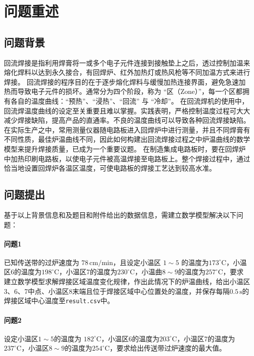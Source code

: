 \documentclass[../main.tex]{subfiles}
\begin{document}
\section{问题重述}
\subsection{问题背景}
回流焊接是指利用焊膏将一或多个电子元件连接到接触垫上之后，透过控制加温来熔化焊料以达到永久接合，有回焊炉、红外加热灯或热风枪等不同加温方式来进行焊接。
回流焊接的程序目的在于逐步熔化焊料与缓慢加热连接界面，避免急速加热而导致电子元件的损坏。通常分为四个阶段，称为 “区（Zone）”，每一个区都拥有各自的温度曲线：“预热”、“浸热”、“回流” 与 “冷却”。
在回流焊机的使用中，回流焊温度曲线的设定至关重要且难以掌握。实践表明，严格控制温度过程可大大减少焊接缺陷，提高产品的直通率。不良的温度曲线可以导致各种回流焊接缺陷。在实际生产之中，常用测量仪器随电路板进入回焊炉中进行测量，并且不同焊膏有不同性质，最佳炉温曲线不同，因此如何构建出回流焊接过程之中炉温曲线的数学模型来提升焊接质量，已成为一个重要议题。
在制造集成电路板时，要在回焊炉中加热印刷电路板，以使电子元件被高温焊接至电路板上。整个焊接过程中，通过恰当地设置回焊炉各温区温度，可使电路板的焊接工艺达到较高水准。

\subsection{问题提出} %
基于以上背景信息和及题目和附件给出的数据信息，需建立数学模型解决以下问题：

\paragraph{问题1}
已知传送带的过炉速度为 \(78\,\mathrm{cm}/\mathrm{min}\)，且设定小温区 \(1{\sim}5\) 的温度为\(173^{\circ} \mathrm{C}\)，小温区6的温度为\(198^{\circ}\mathrm{C}\)，小温区7的温度为\(230^{\circ}\mathrm{C}\)，小温曲\(8{ \sim }9\)的温度为\(257^{\circ}\mathrm{C}\)，要求建立数学模型求解焊接区域温度变化规律，作出此情况下的炉温曲线，给出小温区3、6、7中点、小温区8末端且位于焊接区域中心位置处的温度，并保存每隔\(0.5\, \mathrm{s}\)的焊接区域中心温度至\texttt{result.csv}中。

\paragraph{问题2}
设定小温区\(1{\sim}5\)的温度为 \(182^{\circ}\mathrm{C}\)，小温区6的温度为\(203^{\circ}\mathrm{C}\)，小温区7的温度为\(237^{\circ}\mathrm{C}\)，小温区\(8{\sim}9\)的温度为\(254^{\circ}\mathrm{C}\)，要求给出传送带过炉速度的最大值。
\end{document}

